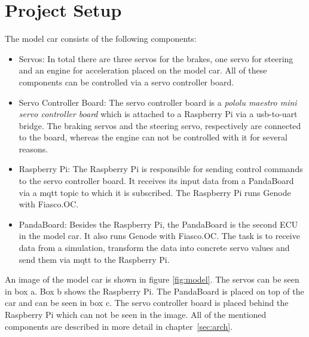 \section{Project Setup}
\label{sec:setup}
The model car consists of the following components: 

\begin{itemize}
    \item Servos: In total there are three servos for the brakes, one servo for steering and an engine for acceleration placed on the model car. All of these components can be controlled via a servo controller board.
   
    \item Servo Controller Board: The servo controller board is a \textit{pololu maestro mini servo controller board} which is attached to a Raspberry Pi via a usb-to-uart bridge. The braking servos and the steering servo, respectively are connected to the board, whereas the engine can not be controlled with it for several reasons.
   
    \item Raspberry Pi: The Raspberry Pi is responsible for sending control commands to the servo controller board. It receives its input data from a PandaBoard via a mqtt topic to which it is subscribed. The Raspberry Pi runs Genode with Fiasco.OC.
   
    \item PandaBoard: Besides the Raspberry Pi, the PandaBoard is the second ECU in the model car. It also runs Genode with Fiasco.OC. The task is to receive data from a simulation, transform the data into concrete servo values and send them via mqtt to the Raspberry Pi.
\end{itemize}

An image of the model car is shown in figure \ref{fig:model}. The servos can be seen in box a. Box b shows the Raspberry Pi. The PandaBoard is placed on top of the car and can be seen in box c. The servo controller board is placed behind the Raspberry Pi which can not be seen in the image. All of the mentioned components are described in more detail in chapter~\ref{sec:arch}. \\

